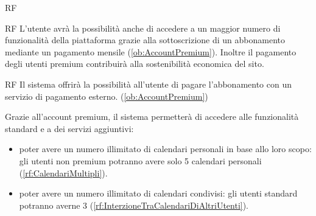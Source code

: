 \begin{listaPersonale}{RF}
\begin{listaPersonale2}{RF}
		 L'utente avrà la possibilità anche di accedere a un maggior numero di funzionalità della piattaforma grazie alla sottoscrizione di un abbonamento mediante un pagamento mensile (\ref{ob:AccountPremium}). Inoltre il pagamento degli utenti premium contribuirà alla sostenibilità economica del sito.
		\begin{listaPersonale3}{RF}
			 Il sistema offrirà la possibilità all'utente di pagare l'abbonamento con un servizio di pagamento esterno. (\ref{ob:AccountPremium})

			 Grazie all'account premium, il sistema permetterà di accedere alle funzionalità standard e a dei servizi aggiuntivi:
			\begin{itemize}
				\item poter avere un numero illimitato di calendari personali in base allo loro scopo: gli utenti non premium potranno avere solo 5 calendari personali (\ref{rf:CalendariMultipli}).
				\item poter avere un numero illimitato di calendari condivisi: gli utenti standard potranno averne 3 (\ref{rf:InterzioneTraCalendariDiAltriUtenti}).
			\end{itemize}
		\end{listaPersonale3}
	\end{listaPersonale2}


\end{listaPersonale}

